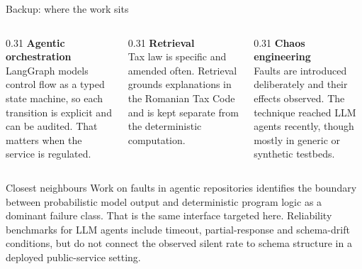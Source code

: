 \documentclass[aspectratio=169,10pt]{beamer}
\newcommand{\cmt}[1]{{\color{stone}\small #1}}          %
\begin{document}
\begin{frame}[noframenumbering]{Backup: where the work sits}
  \begin{columns}[T]
    \begin{column}{0.31\textwidth}
      \textbf{Agentic orchestration}\\[0.3em]
      \cmt{LangGraph models control flow as a typed state machine, so each transition is
      explicit and can be audited. That matters when the service is regulated.}
    \end{column}
    \begin{column}{0.31\textwidth}
      \textbf{Retrieval}\\[0.3em]
      \cmt{Tax law is specific and amended often. Retrieval grounds explanations in the
      Romanian Tax Code and is kept separate from the deterministic computation.}
    \end{column}
    \begin{column}{0.31\textwidth}
      \textbf{Chaos engineering}\\[0.3em]
      \cmt{Faults are introduced deliberately and their effects observed. The technique reached
      LLM agents recently, though mostly in generic or synthetic testbeds.}
    \end{column}
  \end{columns}
  \vfill
  \begin{block}{Closest neighbours}
    \small Work on faults in agentic repositories identifies the boundary between probabilistic
    model output and deterministic program logic as a dominant failure class. That is the same
    interface targeted here. Reliability benchmarks for LLM agents include timeout,
    partial-response and schema-drift conditions, but do not connect the observed silent rate
    to schema structure in a deployed public-service setting.
  \end{block}
\end{frame}
\end{document}
